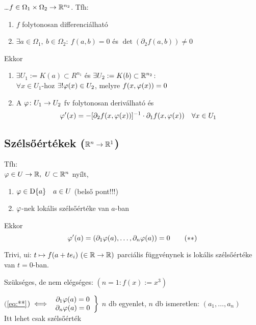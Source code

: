 \begin{te} \ldots $f\in\Omega_1\times \Omega_2\to\mathbb{R}^{n_2}$. Tfh:
  \begin{enumerate}[\quad(i)]
  \item $f$ folytonosan differenciálható
  \item $\exists a \in \Omega_1,\ b\in\Omega_2:\ f(a,b)=0$ és $\det(\partial_2f(a,b))\neq 0$
  \end{enumerate}
  \noindent Ekkor
  {\listazjbetu
    \begin{enumerate}
    \item $\exists U_1:= K(a)\subset R^{n_1}$ és $\exists U_2:=K(b)\subset \mathbb{R}^{n_2}$:\\
      $\forall x\in U_1$-hoz $\exists! \varphi(x)\in U_2$, melyre $f(x,\varphi(x)) = 0$
    \item A $\varphi\colon U_1\to U_2$ fv folytonosan deriválható és
      \[\varphi'(x) = - [\partial_2f(x,\varphi(x))]^{-1}\cdot \partial_1f(x,\varphi(x))\quad\forall x\in U_1 \]
    \end{enumerate}
      }
\end{te}

\subsection{Szélsőértékek ($\mathbb{R}^n\to \mathbb{R}^1$)}
\begin{te}
Tfh: \\$\varphi\in U\to\mathbb{R},\ U\subset \mathbb{R}^n$ nyílt,
\begin{enumerate}
\item $\varphi \in \operatorname{D}\{a\}\quad a\in U$ (belső pont!!!)
\item $\varphi$-nek lokális szélsőértéke van $a$-ban
\end{enumerate}
Ekkor  \[\varphi'(a) = (\partial_1\varphi(a),\dotsc,\partial_n\varphi(a))=0\tag{$**$}\label{eq:**}\]

\end{te}
\begin{biz}Trivi, ui: $t\mapsto f(a+te_i)\ (\in\R\n\R)$ parciális függvénynek is lokális szélsőértéke van $t=0$-ban.
\end{biz}

\newpage
\begin{Megj}
\item Szükséges, de nem elégséges: $(n=1\colon f(x) := x^3)$
\item $($\ref{eq:**}$)\iff \left.\begin{array}{c}\partial_1\varphi(a)=0\\\partial_n\varphi(a)=0\end{array} \right\}$
  $n$ db egyenlet, $n$ db ismeretlen: $(a_1,\dotsc,a_n)$\\
  Itt lehet csak szélsőérték
\end{Megj}

